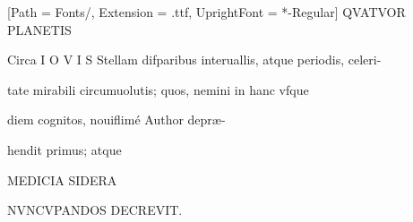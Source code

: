 \documentclass{article}
\begin{document}
\begin{center}
\vspace{1mm}
\setmainfont{EBGaramond}[Path = Fonts/, 
                         Extension = .ttf,
                         UprightFont = *-Regular]
{\fontsize{20}{20}\selectfont Q\hspace{3mm}V\hspace{3mm}A\hspace{3mm}T\hspace{3mm}V\hspace{3mm}O\hspace{3mm}R\hspace{3mm} P\hspace{3mm}L\hspace{3mm}A\hspace{3mm}N\hspace{3mm}E\hspace{3mm}T\hspace{3mm}I\hspace{3mm}S}


\vspace{1mm}
\fontsize{14}{14}\selectfont
Circa I O V I S Stellam difparibus interuallis, atque periodis, celeri-

tate mirabili circumuolutis; quos, nemini in hanc vfque

diem cognitos, nouiflimé Author depræ-

hendit primus; atque


\fontsize{38}{38}\selectfont
M\hspace{2mm}E\hspace{2mm}D\hspace{2mm}I\hspace{2mm}C\hspace{2mm}I\hspace{2mm}A\hspace{2mm} S\hspace{2mm}I\hspace{2mm}D\hspace{2mm}E\hspace{2mm}R\hspace{2mm}A


\vspace{2mm}
\fontsize{16}{16}\selectfont
N\hspace{1mm}V\hspace{1mm}N\hspace{1mm}C\hspace{1mm}V\hspace{1mm}P\hspace{1mm}A\hspace{1mm}N\hspace{1mm}D\hspace{1mm}O\hspace{1mm}S\hspace{1mm} D\hspace{1mm}E\hspace{1mm}C\hspace{1mm}R\hspace{1mm}E\hspace{1mm}V\hspace{1mm}I\hspace{1mm}T\hspace{1mm}.



\end{center}
\end{document}
